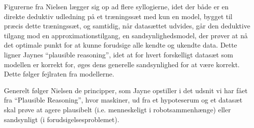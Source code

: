 \documentclass[10pt,a4paper]{article}
\begin{document}
Figurerne fra Nielsen lægger sig op ad flere syllogierne, idet der både er en direkte deduktiv udledning på et træningssæt med kun en model, bygget til præcis dette træningssæt, og samtidig, når datasættet udvides, går den deduktive tilgang mod en approximationstilgang, en sandsynlighedsmodel, der prøver at nå det optimale punkt for at kunne forudsige alle kendte og ukendte data. Dette ligner Jaynes ``plausible reasoning'', idet at for hvert forskelligt datasæt som modellen er korrekt for, øges dens generelle sandsynlighed for at være korrekt. Dette følger fejlraten fra modellerne.

Generelt følger Nielsen de principper, som Jayne opstiller i det udsnit vi har fået fra ``Plausible Reasoning'', hvor maskiner, ud fra et hypoteserum og et datasæt skal prøve at agere plausibelt (i.e. menneskeligt i robotsammenhænge) eller sandsynligt (i forudsigelsesproblemet).
\end{document}
